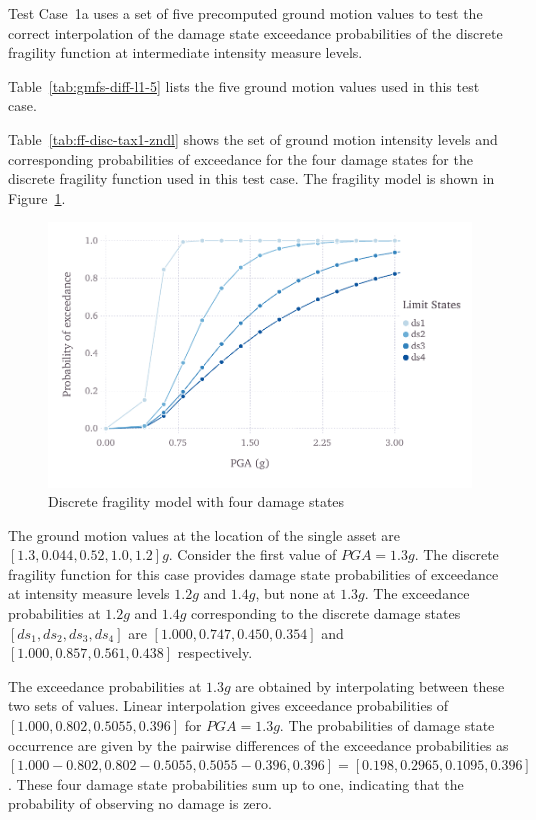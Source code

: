 Test Case~1a uses a set of five precomputed ground motion values to test the correct interpolation of the damage state exceedance probabilities of the discrete fragility function at intermediate intensity measure levels.

Table~\ref{tab:gmfs-diff-l1-5} lists the five ground motion values used in this test case.



Table~\ref{tab:ff-disc-tax1-zndl} shows the set of ground motion intensity levels and corresponding probabilities of exceedance for the four damage states for the discrete fragility function used in this test case. The fragility model is shown in Figure~\ref{fig:ff-disc-tax1-zndl}.

\begin{figure}[htbp]
\centering
\includegraphics[width=12cm]{qareport/figures/fig-ff-disc-tax1-zndl}
\caption{Discrete fragility model with four damage states}
\label{fig:ff-disc-tax1-zndl}
\end{figure}

The ground motion values at the location of the single asset are $[1.3, 0.044, 0.52, 1.0, 1.2] g$. Consider the first value of $PGA = 1.3 g$. The discrete fragility function for this case provides damage state probabilities of exceedance at intensity measure levels $1.2 g$ and $1.4 g$, but none at $1.3 g$. The exceedance probabilities at $1.2 g$ and $1.4 g$ corresponding to the discrete damage states $[ds_1, ds_2, ds_3, ds_4]$ are $[1.000, 0.747, 0.450, 0.354]$ and $[1.000, 0.857, 0.561, 0.438]$ respectively.

The exceedance probabilities at $1.3 g$ are obtained by interpolating between these two sets of values. Linear interpolation gives exceedance probabilities of $[1.000, 0.802, 0.5055, 0.396]$ for $PGA = 1.3 g$. The probabilities of damage state occurrence are given by the pairwise differences of the exceedance probabilities as $[1.000 - 0.802, 0.802 - 0.5055, 0.5055 - 0.396, 0.396] = [0.198, 0.2965, 0.1095, 0.396]$. These four damage state probabilities sum up to one, indicating that the probability of observing no damage is zero.

